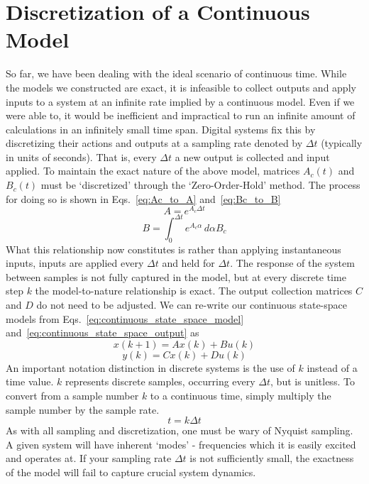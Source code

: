 \FloatBarrier\section{Discretization of a Continuous Model} %
So far, we have been dealing with the ideal scenario of continuous time. While the models we constructed are exact, it is infeasible to collect outputs and apply inputs to a system at an infinite rate implied by a continuous model. Even if we were able to, it would be inefficient and impractical to run an infinite amount of calculations in an infinitely small time span. 
Digital systems fix this by discretizing their actions and outputs at a sampling rate denoted by $\Delta t$ (typically in units of seconds).  That is, every $\Delta t$ a new output is collected and input applied. To maintain the exact nature of the above model, matrices $A_c(t)$ and $B_c(t)$ must be `discretized' through the `Zero-Order-Hold' method. The process for doing so is shown in Eqs.~\ref{eq:Ac_to_A} and~\ref{eq:Bc_to_B}
\begin{equation}
    A = e^{A_c \Delta t}
    \label{eq:Ac_to_A}
\end{equation}
\begin{equation}
    B = \int_{0}^{\Delta t}  e^{A_c \alpha}\,d\alpha B_c 
    \label{eq:Bc_to_B}
\end{equation}
What this relationship now constitutes is rather than applying instantaneous inputs, inputs are applied every $\Delta t$ and held for $\Delta t$. The response of the system between samples is not fully captured in the model, but at every discrete time step $k$ the model-to-nature relationship is exact. The output collection matrices $C$ and $D$ do not need to be adjusted. We can re-write our continuous state-space models from Eqs.~\ref{eq:continuous_state_space_model} and~\ref{eq:continuous_state_space_output} as
\begin{equation}
    x(k+1) = Ax(k) + Bu(k)
    \label{eq:discrete_state_space_model}
\end{equation}
\begin{equation}
    y(k) = Cx(k) + Du(k)
    \label{eq:discrete_state_space_output}
\end{equation}
An important notation distinction in discrete systems is the use of $k$ instead of a time value. $k$ represents discrete samples, occurring every $\Delta t$, but is unitless. To convert from a sample number $k$ to a continuous time, simply multiply the sample number by the sample rate.
\begin{equation}
    t = k \Delta t
    \label{eq:samples_to_time}
\end{equation}
As with all sampling and discretization, one must be wary of Nyquist sampling. A given system will have inherent `modes' - frequencies which it is easily excited and operates at. If your sampling rate $\Delta t$ is not sufficiently small, the exactness of the model will fail to capture crucial system dynamics.

